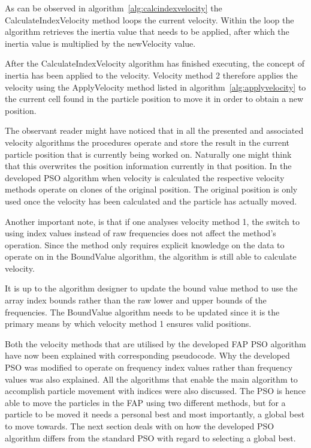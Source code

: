 As can be observed in algorithm~\ref{alg:calcindexvelocity} the CalculateIndexVelocity method loops the current velocity. Within the loop the algorithm retrieves the inertia value that needs to be applied, after which the inertia value is multiplied by the newVelocity value.

After the CalculateIndexVelocity algorithm has finished executing, the concept of inertia has been applied to the velocity. Velocity method 2 therefore applies the velocity using the ApplyVelocity method listed in algorithm~\ref{alg:applyvelocity} to the current cell found in the particle position to move it in order to obtain a new position.

The observant reader might have noticed that in all the presented and associated velocity algorithms the procedures operate and store the result in the current particle position that is currently being worked on. Naturally one might think that this overwrites the position information currently in that position. In the developed PSO algorithm when velocity is calculated the respective velocity methods operate on clones of the original position. The original position is only used once the velocity has been calculated and the particle has actually moved.

Another important note, is that if one analyses velocity method 1, the switch to using index values instead of raw frequencies does not affect the method's operation. Since the method only requires explicit knowledge on the data to operate on in the BoundValue algorithm, the algorithm is still able to calculate velocity. 

It is up to the algorithm designer to update the bound value method to use the array index bounds rather than the raw lower and upper bounds of the frequencies. The BoundValue algorithm needs to be updated since it is the primary means by which velocity method 1 ensures valid positions.

Both the velocity methods that are utilised by the developed FAP PSO algorithm have now been explained with corresponding pseudocode. Why the developed PSO was modified to operate on frequency index values rather than frequency values was also explained. All the algorithms that enable the main algorithm to accomplish particle movement with indices were also discussed. The PSO is hence able to move the particles in the FAP using two different methods, but for a particle to be moved it needs a personal best and most importantly, a global best to move towards. The next section deals with on how the developed PSO algorithm differs from the standard PSO with regard to selecting a global best.
